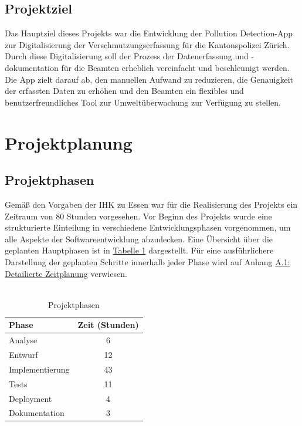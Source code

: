 \documentclass[a4paper,12pt]{article}
\begin{document}
\subsection{Projektziel}
Das Hauptziel dieses Projekts war die Entwicklung der \glqq Pollution Detection\grqq{}-App zur Digitalisierung der Verschmutzungserfassung für die Kantonspolizei Zürich. Durch diese Digitalisierung soll der Prozess der Datenerfassung und -dokumentation für die Beamten erheblich vereinfacht und beschleunigt werden. Die App zielt darauf ab, den manuellen Aufwand zu reduzieren, die Genauigkeit der erfassten Daten zu erhöhen und den Beamten ein flexibles und benutzerfreundliches Tool zur Umweltüberwachung zur Verfügung zu stellen.

\section{Projektplanung}
\subsection{Projektphasen}
Gemäß den Vorgaben der IHK zu Essen war für die Realisierung des Projekts ein Zeitraum von 80 Stunden vorgesehen\cite{ihk2023essen}. Vor Beginn des Projekts wurde eine strukturierte Einteilung in verschiedene Entwicklungsphasen vorgenommen, um alle Aspekte der Softwareentwicklung abzudecken. Eine Übersicht über die geplanten Hauptphasen ist in  \hyperlink{Projektphasen}{Tabelle 1} dargestellt. Für eine ausführlichere Darstellung der geplanten Schritte innerhalb jeder Phase wird auf Anhang \hyperref[sec:detaillierte zeitplanung]{A.1: Detailierte Zeitplanung} verwiesen.\\
\\

\hypertarget{Projektphasen}{}
\begin{table}[h]
\centering
\begin{tabularx}{\textwidth}{|X|c|}
    \hline
    \rowcolor{gray}\textbf{Phase} & \textbf{Zeit (Stunden)} \\
    \hline
    Analyse & 6 \\
    \hline
    Entwurf & 12 \\
    \hline
    Implementierung & 43 \\
    \hline
    Tests & 11 \\
    \hline
    Deployment & 4 \\
    \hline
    Dokumentation & 3 \\
    \hline
\end{tabularx}
\caption{Projektphasen}
\label{tab:Projektphasen}
\end{table}
\end{document}
